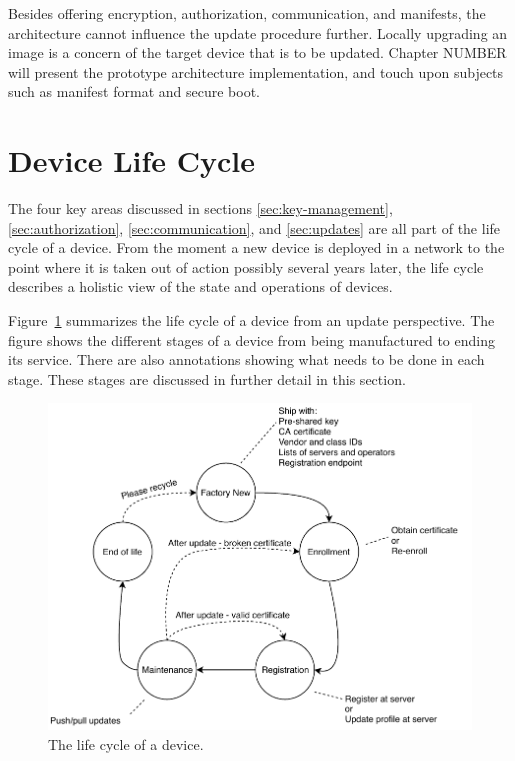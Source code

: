 \documentclass[0-thesis.tex]{subfiles}
\begin{document}
Besides offering encryption, authorization, communication, and manifests, the architecture
cannot influence the update procedure further. Locally upgrading an image is a concern of
the target device that is to be updated. Chapter NUMBER will present the prototype
architecture implementation, and touch upon subjects such as manifest format and secure
boot.

\section{Device Life Cycle}
\label{sec:device-lifecycle}
The four key areas discussed in sections \ref{sec:key-management},
\ref{sec:authorization}, \ref{sec:communication}, and \ref{sec:updates} are all part of
the life cycle of a device. From the moment a new device is deployed in a network to the
point where it is taken out of action possibly several years later, the life cycle
describes a holistic view of the state and operations of devices.

Figure~\ref{fig:lifecycle} summarizes the life cycle of a device from an update
perspective. The figure shows the different stages of a device from being manufactured to
ending its service. There are also annotations showing what needs to be done in each
stage. These stages are discussed in further detail in this section.

\begin{figure}
    \caption{The life cycle of a device.}
    \label{fig:lifecycle}
    \includegraphics{images/lifecycle.pdf}
\end{figure}
\end{document}

